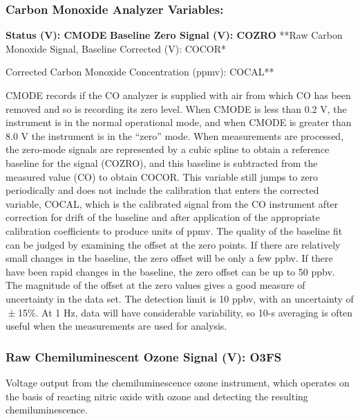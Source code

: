 \documentclass[
  english,
]{book}
\begin{document}
\hypertarget{co-vars}{%
\subsubsection*{Carbon Monoxide Analyzer Variables:}\label{co-vars}}

\textbf{Status (V): CMODE}
\textbf{Baseline Zero Signal (V): COZRO}
**Raw Carbon Monoxide Signal, Baseline Corrected (V): COCOR*

\textbf{
}Corrected Carbon Monoxide Concentration (ppmv): COCAL**

CMODE records if the CO analyzer is supplied with air from which CO has been removed and so is recording its zero level. When CMODE is less than 0.2 V, the instrument is in the normal operational mode, and when CMODE is greater than 8.0 V the instrument is in the ``zero'' mode. When measurements are processed, the zero-mode signals are represented by a cubic spline to obtain a reference baseline for the signal (COZRO), and this baseline is subtracted from the measured value (CO) to obtain COCOR. This variable still jumps to zero periodically and does not include the calibration that enters the corrected variable, COCAL, which is the calibrated signal from the CO instrument after correction for drift of the baseline and after application of the appropriate calibration coefficients to produce units of ppmv. The quality of the baseline fit can be judged by examining the offset at the zero points. If there are relatively small changes in the baseline, the zero offset will be only a few ppbv. If there have been rapid changes in the baseline, the zero offset can be up to 50 ppbv. The magnitude of the offset at the zero values gives a good measure of uncertainty in the data set. The detection limit is 10 ppbv, with an uncertainty of { ± 15\%}. At 1 Hz, data will have considerable variability, so 10-s averaging is often useful when the measurements are used for analysis.

\hypertarget{o3fs}{%
\subsubsection*{Raw Chemiluminescent Ozone Signal (V): O3FS}\label{o3fs}}

Voltage output from the chemiluminescence ozone instrument, which operates on the basis of reacting nitric oxide with ozone and detecting the resulting chemiluminescence.
\end{document}
